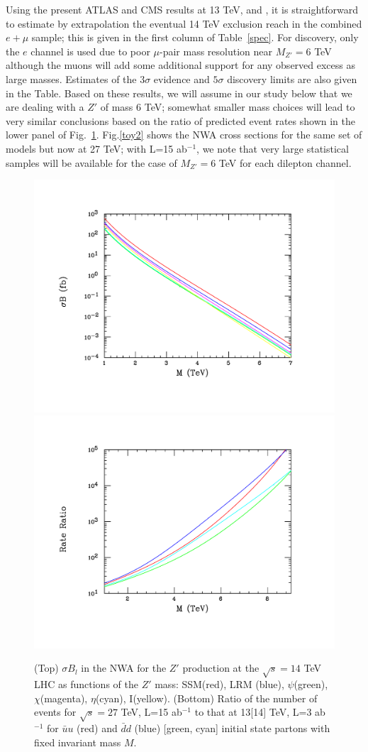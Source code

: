 \documentclass[14pt]{article}
\begin{document}
Using the present ATLAS and CMS results at 13 TeV, \cite{Aaboud:2017buh} and \cite{Sirunyan:2018exx}, it is straightforward to estimate by extrapolation the eventual 14 TeV 
exclusion reach in the combined $e+\mu$ sample; this is given in the first column of Table~\ref{spec}. For discovery, only the $e$ channel is used due to poor $\mu$-pair mass 
resolution near $M_{Z'}=6$ TeV although the muons will add some additional support for any observed excess as large masses. Estimates of the $3\sigma$ evidence and $5\sigma$ 
discovery limits are also given in the Table. Based on these results, we will assume in our study below that we are dealing with a $Z'$ of mass 6 TeV; somewhat smaller mass 
choices will lead to very similar conclusions based on the ratio of predicted event rates shown in the lower panel of Fig.~\ref{toy}.  Fig.\ref{toy2} shows the NWA cross 
sections for the same set of models but now at 27 TeV; with L=15 ab$^{-1}$, we note that very large statistical samples will be available for the case of $M_{Z'}=6$ TeV 
for each dilepton channel. 


\begin{figure}[htbp]
  \centering
    \includegraphics[trim={2cm 2cm 2cm 2cm},clip,width=0.49\columnwidth]{figures/zp14tev-ref.pdf}
    \includegraphics[trim={2cm 2cm 2cm 2cm},clip,width=0.49\columnwidth]{figures/scaled-ratio.pdf}
\caption{(Top) $\sigma B_l$ in the NWA for the $Z'$ production at the $\sqrt s=14$ TeV LHC as functions of the $Z'$ mass: SSM(red), LRM (blue), $\psi$(green), $\chi$(magenta), 
$\eta$(cyan), I(yellow).  (Bottom) Ratio of the number of events  for $\sqrt s=27$ TeV, L=15 ab$^{-1}$ to that at 13[14] TeV, L=3 ab$^{-1}$ for 
$\bar u u$ (red) and $\bar d d$ (blue)  [green, cyan] initial state partons with fixed invariant mass $M$.}
\label{toy}
\end{figure}
\end{document}
